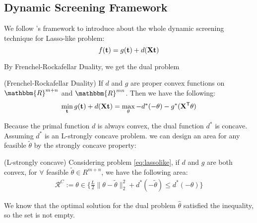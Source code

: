 \subsection{Dynamic Screening Framework}

We follow \citep{NEURIPS2021_7b5b23f4}'s framework to introduce about the whole dynamic screening technique for Lasso-like problem:
\begin{equation}
\label{eq:lassolike}
f(\mathbf t) = g(\mathbf t) + d(\mathbf{X} \mathbf t)
\end{equation}

By Frenchel-Rockafellar Duality, we get the dual problem
\begin{thm}
 (Frenchel-Rockafellar Duality) If $d$ and $g$ are proper convex functions on $\mathbbm{R}^{m+n}$ and $\mathbbm{R}^{mn}$. Then we have the following:
 $$
\begin{aligned}
\min_\mathbf t  g(\mathbf t) + d(\mathbf{X}\mathbf t) = \max_{\theta} -d^*(-\theta)-g^*(\mathbf{X}^{\mathsf T}\theta)
\end{aligned}
$$
\end{thm}

Because the primal function $d$ is always convex, the dual function $d^*$ is concave. Assuming $d^*$ is an L-strongly concave problem. we can design an area for any feasible $\tilde{\theta}$ by the strongly concave property:

\begin{thm}\label{circle}
(L-strongly concave) Considering problem \ref{eq:lassolike}, if $d$ and $g$ are both convex, for $\forall$ feasible $\tilde{\theta} \in{R^{m+n}}$, we have the following area:  
$$
\begin{aligned}
\mathcal{R}^{C}:=\theta \in \{\frac{L}{2}\|\theta-\tilde{\theta}\|_2^2+d^*(-\tilde{\theta}) \leq d^*(-\theta)\}
\end{aligned}
$$
\end{thm}
We know that the optimal solution for the dual problem $\hat{\theta}$ satisfied the inequality, so the set is not empty.





















